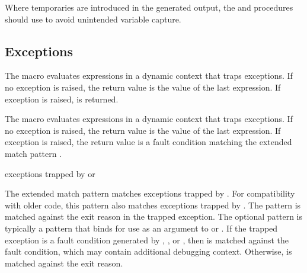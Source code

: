 Where temporaries are introduced in the generated output,
the  and  procedures should use
 to avoid unintended variable capture.

\subsection {Exceptions}

\begin{syntax}
\end{syntax}
\expandsto{}

The  macro evaluates expressions  
\etc{} in a dynamic context that traps exceptions.  If no exception is
raised, the return value is the value of the last expression. If
exception  is raised,  is
returned.

\begin{syntax}
\end{syntax}
\expandsto{}

The  macro evaluates expressions  
\etc{} in a dynamic context that traps exceptions.  If no exception is
raised, the return value is the value of the last expression. If
exception  is raised, the return value is a fault condition
matching the extended match pattern .

\begin{match-extension}
\end{match-extension}
\matches{} exceptions trapped by  or 

The extended match pattern  matches
exceptions trapped by .
For compatibility with older code, this pattern also matches exceptions
trapped by .
The  pattern is matched against the exit reason in the trapped exception.
The optional  pattern is typically a  pattern that
binds  for use as an argument to  or .
If the trapped exception is a fault condition generated by ,
, or , then  is
matched against the fault condition, which may contain additional debugging context.
Otherwise,  is matched against the exit reason.

